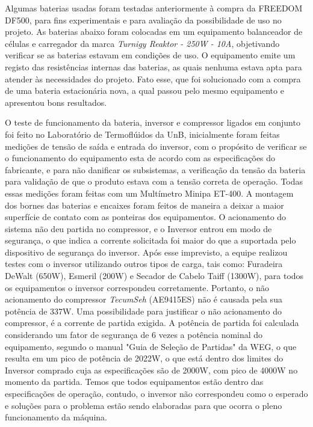 
		 Algumas baterias usadas foram testadas anteriormente à compra da FREEDOM DF500, para fins experimentais e para avaliação da possibilidade de uso no projeto. As baterias abaixo foram colocadas em um equipamento balanceador de células e carregador da marca \textit{Turnigy Reaktor - 250W - 10A}, objetivando verificar se as baterias estavam em condições de uso. O equipamento emite um registo das resistências internas das baterias, as quais nenhuma estava apta para atender às necessidades do projeto. Fato esse, que foi solucionado com a compra de uma bateria estacionária nova, a qual passou pelo mesmo equipamento e apresentou bons resultados.
         
		
       O teste de funcionamento da bateria, inversor e compressor ligados em conjunto foi feito no Laboratório de Termoflúidos da UnB, inicialmente foram feitas medições de tensão de saída e entrada do inversor, com o propósito  de verificar se o funcionamento do equipamento esta de acordo com as especificações do fabricante, e para não danificar os subsistemas, a verificação da tensão da bateria para validação de que o produto estava com a tensão correta de operação. Todas essas medições foram feitas com um Multímetro Minipa ET-400. A montagem dos bornes das baterias e encaixes foram feitos de maneira a deixar a maior superfície de contato com as ponteiras dos equipamentos.
       O acionamento do sistema não deu partida no compressor, e o Inversor entrou em modo de segurança, o que indica  a corrente solicitada foi maior do que a suportada pelo dispositivo de segurança do inversor. Após esse imprevisto, a equipe realizou testes com o inversor utilizando outros tipos de carga, tais como: Furadeira DeWalt (650W), Esmeril (200W) e Secador de Cabelo Taiff (1300W), para todos os equipamentos o inversor correspondeu corretamente. Portanto,  o não acionamento do compressor \textit{TecumSeh} (AE9415ES) não é causada pela sua potência de 337W. 
       Uma possibilidade para justificar o não acionamento do compressor, é a corrente de partida exigida. A potência de partida foi calculada considerando um fator de segurança de 6 vezes a potência nominal do equipamento, segundo o manual "Guia de Seleção de Partidas" da WEG, o que resulta em um pico de potência de 2022W, o que está dentro dos limites do Inversor comprado cuja as especificações são de 2000W, com pico de 4000W no momento da partida. Temos que todos equipamentos estão dentro das especificações de operação, contudo, o inversor não correspondeu como o esperado e soluções para o problema estão sendo elaboradas para que ocorra o pleno funcionamento da máquina.
       
